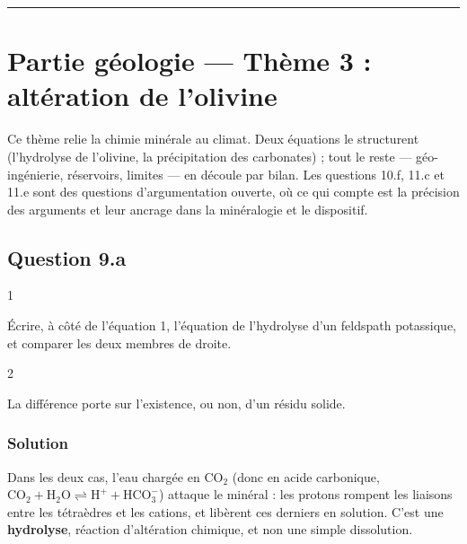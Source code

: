 \documentclass[11pt,a4paper]{article}
\begin{document}
\begin{center}\rule{0.5\linewidth}{0.5pt}\end{center}

\hypertarget{partie-guxe9ologie-thuxe8me-3-altuxe9ration-de-lolivine}{%
\section{Partie géologie --- Thème 3 : altération de l'olivine}\label{partie-guxe9ologie-thuxe8me-3-altuxe9ration-de-lolivine}}

Ce thème relie la chimie minérale au climat. Deux équations le structurent (l'hydrolyse de l'olivine, la précipitation des carbonates) ; tout le reste --- géo-ingénierie, réservoirs, limites --- en découle par bilan. Les questions 10.f, 11.c et 11.e sont des questions d'argumentation ouverte, où ce qui compte est la précision des arguments et leur ancrage dans la minéralogie et le dispositif.

\hypertarget{question-9.a}{%
\subsection{Question 9.a}\label{question-9.a}}

\begin{indication}{1}

Écrire, à côté de l'équation 1, l'équation de l'hydrolyse d'un feldspath potassique, et comparer les deux membres de droite.

\end{indication}

\begin{indication}{2}

La différence porte sur l'existence, ou non, d'un résidu solide.

\end{indication}

\hypertarget{solution-27}{%
\subsubsection{Solution}\label{solution-27}}

Dans les deux cas, l'eau chargée en \(\mathrm{CO_2}\) (donc en acide carbonique, \(\mathrm{CO_2} + \mathrm{H_2O} \rightleftharpoons \mathrm{H^+} + \mathrm{HCO_3^-}\)) attaque le minéral : les protons rompent les liaisons entre les tétraèdres et les cations, et libèrent ces derniers en solution. C'est une \textbf{hydrolyse}, réaction d'altération chimique, et non une simple dissolution.
\end{document}
